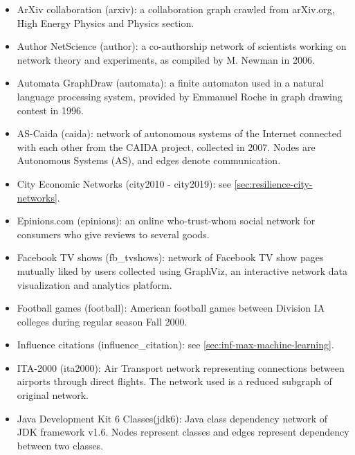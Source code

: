 		\begin{itemize}
			\item ArXiv collaboration (arxiv)\cite{leskovec2007c}: a collaboration graph crawled from arXiv.org, High Energy Physics and Physics section.
			
			\item Author NetScience (author)\cite{newman2006b}: a co-authorship network of scientists working on network theory and experiments, as compiled by M. Newman in 2006.
			
			\item Automata GraphDraw (automata)\cite{eades1996}: a finite automaton used in a natural language processing system, provided by Emmanuel Roche in graph drawing contest in 1996.
			
			\item AS-Caida (caida)\cite{leskovec2007c,ascaida}: network of autonomous systems of the Internet connected with each other from the CAIDA project, collected in 2007. Nodes are Autonomous Systems (AS), and edges denote communication.
			
			\item City Economic Networks (city2010 - city2019): see \ref{sec:resilience-city-networks}.
			
			\item Epinions.com (epinions)\cite{richardson2003}: an online who-trust-whom social network for consumers who give reviews to several goods.
			
			\item Facebook TV shows (fb\_tvshows)\cite{rossi2015}: network of Facebook TV show pages mutually liked by users collected using GraphViz, an interactive network data visualization and analytics platform.
			
			\item Football games (football)\cite{girvan2002}: American football games between Division IA colleges during regular season Fall 2000.
			
			\item Influence citations (influence\_citation): see \ref{sec:inf-max-machine-learning}.
			
			\item ITA-2000 (ita2000)\cite{rozenblat2008}: Air Transport network representing connections between airports through direct flights. The network used is a reduced subgraph of original network.
			
			\item Java Development Kit 6 Classes(jdk6)\cite{jdk}: Java class dependency network of JDK framework v1.6. Nodes represent classes and edges represent dependency between two classes.
			

\end{itemize}
